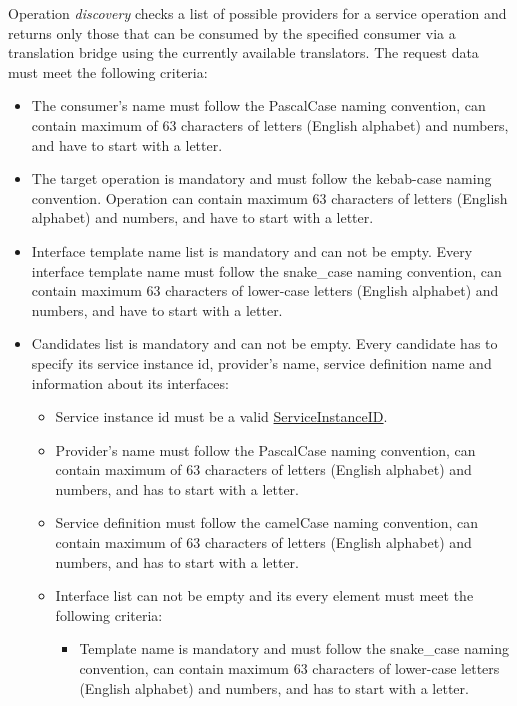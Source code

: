 \documentclass[a4paper]{arrowhead}
\newcommand{\pref}[1]{{\textcolor{ArrowheadGrey}{\hyperref[sec:model:primitives:#1]{#1}}}}
\begin{document}
{}

Operation \textit{discovery} checks a list of possible providers for a service operation and returns only those that can be consumed by the specified consumer via a translation bridge using the currently available translators. The request data must meet the following criteria:

\begin{itemize}
    \item The consumer's name must follow the PascalCase naming convention, can contain maximum of 63 characters of letters (English alphabet) and numbers, and have to start with a letter.
    \item The target operation is mandatory and must follow the kebab-case naming convention. Operation can contain maximum 63 characters of letters (English alphabet) and numbers, and have to start with a letter.
    \item Interface template name list is mandatory and can not be empty. Every interface template name must follow the snake\_case naming convention, can contain maximum 63 characters of lower-case letters (English alphabet) and numbers, and have to start with a letter.
    \item Candidates list is mandatory and can not be empty. Every candidate has to specify its service instance id, provider's name, service definition name and information about its interfaces:
    \begin{itemize}
        \item Service instance id must be a valid \pref{ServiceInstanceID}.
        \item Provider's name must follow the PascalCase naming convention, can contain maximum of 63 characters of letters (English alphabet) and numbers, and has to start with a letter.
        \item Service definition must follow the camelCase naming convention, can contain maximum of 63 characters of letters (English alphabet) and numbers, and has to start with a letter.
        \item Interface list can not be empty and its every element must meet the following criteria:
        \begin{itemize}
            \item Template name is mandatory and must follow the snake\_case naming convention, can contain maximum 63 characters of lower-case letters (English alphabet) and numbers, and has to start with a letter.

\end{itemize}
\end{itemize}
\end{itemize}
\end{document}
